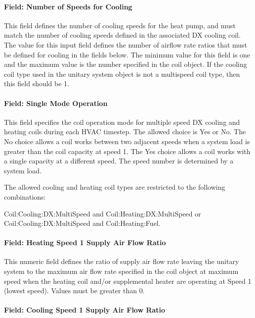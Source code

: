 \paragraph{Field: Number of Speeds for Cooling}\label{field-number-of-speeds-for-cooling-000}

This field defines the number of cooling speeds for the heat pump, and must match the number of cooling speeds defined in the associated DX cooling coil. The value for this input field defines the number of airflow rate ratios that must be defined for cooling in the fields below. The minimum value for this field is one and the maximum value is the number specified in the coil object. If the cooling coil type used in the unitary system object is not a multispeed coil type, then this field should be 1.

\paragraph{Field: Single Mode Operation}\label{field-single-mode-operation}

This field specifies the coil operation mode for multiple speed DX cooling and heating coils during each HVAC timestep. The allowed choice is Yes or No. The No choice allows a coil works between two adjacent speeds when a system load is greater than the coil capacity at speed 1. The Yes choice allows a coil works with a single capacity at a different speed. The speed number is determined by a system load.

The allowed cooling and heating coil types are restricted to the following combinations:

Coil:Cooling:DX:MultiSpeed and Coil:Heating:DX:MultiSpeed or Coil:Cooling:DX:MultiSpeed and Coil:Heating:Fuel. 

\paragraph{Field: Heating Speed 1 Supply Air Flow Ratio}\label{field-heating-speed-1-supply-air-flow-ratio}

This numeric field defines the ratio of supply air flow rate leaving the unitary system to the maximum air flow rate specified in the coil object at maximum speed when the heating coil and/or supplemental heater are operating at Speed 1 (lowest speed). Values must be greater than 0.

\paragraph{Field: Cooling Speed 1 Supply Air Flow Ratio}\label{field-cooling-speed-1-supply-air-flow-ratio}

